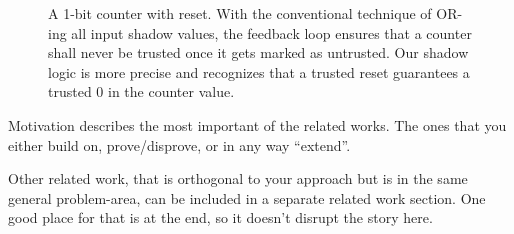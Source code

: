 \begin{figure}[t]
\begin{center}
\vspace{-0.2in}
\caption{A 1-bit counter with reset. With the conventional technique of OR-ing all input shadow values, the feedback loop ensures that a 
counter shall never be trusted once it gets marked as untrusted. Our shadow logic is more precise and recognizes that a trusted reset 
guarantees a trusted $0$ in the counter value.}
\label{fig:1bcounter}
\end{center}
\end{figure}

Motivation describes the most important of the related works. The ones that 
you either build on, prove/disprove, or in any way ``extend''. 

Other related work, that is orthogonal to your approach but is in the same
general problem-area, can be included in a separate related work section.
One good place for that is at the end, so it doesn't disrupt the story here.
